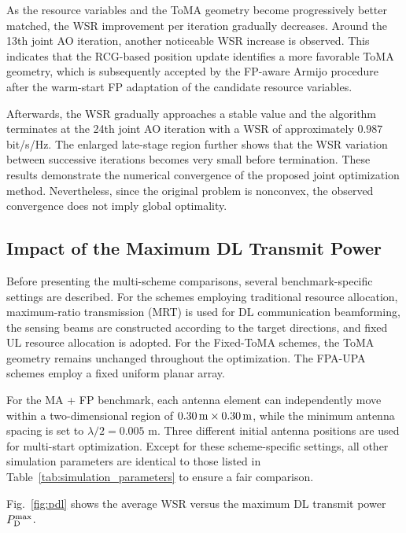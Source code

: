\documentclass[letterpaper,journal]{IEEEtran}
\begin{document}
As the resource variables and the ToMA geometry become progressively
better matched, the WSR improvement per iteration gradually decreases.
Around the 13th joint AO iteration, another noticeable WSR increase is
observed. This indicates that the RCG-based position update identifies a
more favorable ToMA geometry, which is subsequently accepted by the
FP-aware Armijo procedure after the warm-start FP adaptation of the
candidate resource variables.

Afterwards, the WSR gradually approaches a stable value and the
algorithm terminates at the 24th joint AO iteration with a WSR of
approximately $0.987$ bit/s/Hz. The enlarged late-stage region further
shows that the WSR variation between successive iterations becomes very
small before termination. These results demonstrate the numerical
convergence of the proposed joint optimization method. Nevertheless,
since the original problem is nonconvex, the observed convergence does
not imply global optimality.

\subsection{Impact of the Maximum DL Transmit Power}
\label{subsec:pdl}

Before presenting the multi-scheme comparisons, several
benchmark-specific settings are described. For the schemes employing
traditional resource allocation, maximum-ratio transmission (MRT) is
used for DL communication beamforming, the sensing beams are constructed
according to the target directions, and fixed UL resource allocation is
adopted. For the Fixed-ToMA schemes, the ToMA geometry remains unchanged
throughout the optimization. The FPA-UPA schemes employ a fixed uniform
planar array.

For the MA + FP benchmark, each antenna element can independently move
within a two-dimensional region of
$0.30\,{\rm m}\times0.30\,{\rm m}$, while the minimum antenna spacing is
set to $\lambda/2=0.005$ m. Three different initial antenna positions
are used for multi-start optimization. Except for these
scheme-specific settings, all other simulation parameters are identical
to those listed in Table~\ref{tab:simulation_parameters} to ensure a
fair comparison.

Fig.~\ref{fig:pdl} shows the average WSR versus the maximum DL transmit
power $P_{\rm D}^{\max}$.
\end{document}
